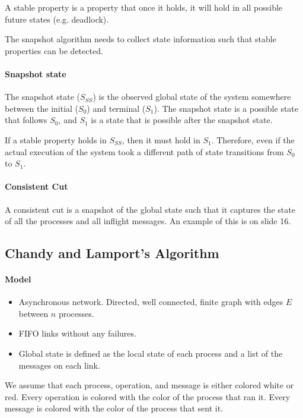 \documentclass{idc_msc}
\begin{document}
A stable property is a property that once it holds, it will hold in all possible future states (e.g. deadlock).

The snapshot algorithm needs to collect state information such that stable properties can be detected.

\paragraph{Snapshot state}

The snapshot state ($S_{SS}$) is the observed global state of the system somewhere between the initial ($S_0$) and terminal ($S_1$).
The snapshot state is a possible state that follows $S_0$, and $S_1$ is a state that is possible after the snapshot state.

If a stable property holds in $S_{SS}$, then it must hold in $S_1$.
Therefore, even if the actual execution of the system took a different path of state transitions from $S_0$ to $S_1$.

\paragraph{Consistent Cut}

A consistent cut is a snapshot of the global state such that it captures the state of all the processes and all inflight messages. An example of this is on slide 16.

\subsection{Chandy and Lamport's Algorithm}

\paragraph{Model}

\begin{itemize}
  \item Asynchronous network. Directed, well connected, finite graph with edges $E$ between $n$ processes.
  \item FIFO links without any failures.
  \item Global state is defined as the local state of each process and a list of the messages on each link.
\end{itemize}

We assume that each process, operation, and message is either colored white or red.
Every operation is colored with the color of the process that ran it.
Every message is colored with the color of the process that sent it.
\end{document}
